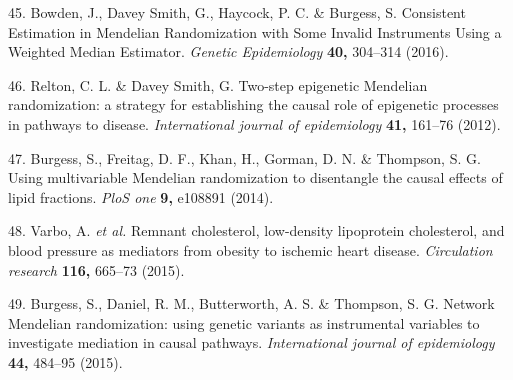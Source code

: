 \documentclass[]{article}
\begin{document}
\hypertarget{ref-Bowden2016b}{}
45. Bowden, J., Davey Smith, G., Haycock, P. C. \& Burgess, S.
Consistent Estimation in Mendelian Randomization with Some Invalid
Instruments Using a Weighted Median Estimator. \emph{Genetic
Epidemiology} \textbf{40,} 304--314 (2016).

\hypertarget{ref-Relton2012}{}
46. Relton, C. L. \& Davey Smith, G. Two-step epigenetic Mendelian
randomization: a strategy for establishing the causal role of epigenetic
processes in pathways to disease. \emph{International journal of
epidemiology} \textbf{41,} 161--76 (2012).

\hypertarget{ref-Burgess2014a}{}
47. Burgess, S., Freitag, D. F., Khan, H., Gorman, D. N. \& Thompson, S.
G. Using multivariable Mendelian randomization to disentangle the causal
effects of lipid fractions. \emph{PloS one} \textbf{9,} e108891 (2014).

\hypertarget{ref-Varbo2015}{}
48. Varbo, A. \emph{et al.} Remnant cholesterol, low-density lipoprotein
cholesterol, and blood pressure as mediators from obesity to ischemic
heart disease. \emph{Circulation research} \textbf{116,} 665--73 (2015).

\hypertarget{ref-Burgess2015}{}
49. Burgess, S., Daniel, R. M., Butterworth, A. S. \& Thompson, S. G.
Network Mendelian randomization: using genetic variants as instrumental
variables to investigate mediation in causal pathways.
\emph{International journal of epidemiology} \textbf{44,} 484--95
(2015).
\end{document}
